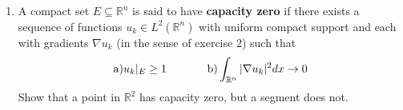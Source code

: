 \documentclass[12pt,leqno]{book}
\theoremstyle{definition}
\newcommand{\R}{\mathbb{R}}
\newenvironment{Proof}{\begin{proof}[\textnormal{\textbf{Proof}}]}{\end{proof}}
\begin{document}
\begin{enumerate}
\begin{Proof}
 By the Kolmogorov compactness criterion, we show that the set described above is compact by showing that, for every $\epsilon>0$ there is a $\delta>0$ such that, if $\|h\|<\delta$, then $\|u(x+h)-u(x)\|_2<\epsilon$ (the condition that the set be supported in a fixed ball is given in the statement above).

By the previous problem \[u(x+h)-u(x)=\frac{1}{\alpha_n}\int_{Q_1}\left(\frac{y-x-h}{|y-x-h|^n}-\frac{y-x}{|y-x|^n}\right)\nabla udy\] Applying H\"{o}lder's Inequality, we we have \[\|u(x+h)-u(x)\|_2\leq\frac{1}{\alpha_n}\left(\int_{Q_1}\left(\frac{y-x-h}{|y-x-h|^n}-\frac{y-x}{|y-x|^n}\right)^2dy\right)^{1/2}\] By the appropriate choice of $\delta$, we see that, if $\|h\|<\delta$, then the value above is less than $\epsilon$.
\end{Proof}

 \item A compact set $E\subseteq\R^n$ is said to have \textbf{capacity zero} if there exists a sequence of functions $u_k\in L^2(\R^n)$ with uniform compact support and each with gradients $\nabla u_k$ (in the sense of exercise 2) such that \[\text{a})u_k|_E\geq1\hskip.5in\text{b})\int_{\R^n}|\nabla u_k|^2dx\to0\] Show that a point in $\R^2$ has capacity zero, but a segment does not.
\end{enumerate}
\end{document}
